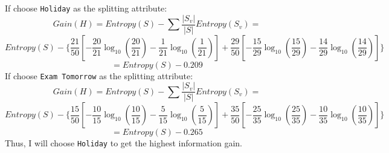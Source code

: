 If choose \texttt{Holiday} as the splitting attribute:
\begin{equation*}
	Gain(H) = Entropy(S) - \sum \frac{|S_v|}{|S|}Entropy(S_v)=
\end{equation*}
\begin{equation*}
	Entropy(S) - \{\frac{21}{50}[-\frac{20}{21}\log_{10}(\frac{20}{21})-\frac{1}{21}\log_{10}(\frac{1}{21})] + \frac{29}{50}[-\frac{15}{29}\log_{10}(\frac{15}{29})-\frac{14}{29}\log_{10}(\frac{14}{29})]\}
\end{equation*}
\begin{equation*}
	 = Entropy(S)-0.209
\end{equation*}
If choose \texttt{Exam Tomorrow} as the splitting attribute:
\begin{equation*}
	Gain(H) = Entropy(S) - \sum \frac{|S_v|}{|S|}Entropy(S_v)=
\end{equation*}
\begin{equation*}
	Entropy(S) - \{\frac{15}{50}[-\frac{10}{15}\log_{10}(\frac{10}{15})-\frac{5}{15}\log_{10}(\frac{5}{15})] + \frac{35}{50}[-\frac{25}{35}\log_{10}(\frac{25}{35})-\frac{10}{35}\log_{10}(\frac{10}{35})]\}
\end{equation*}
\begin{equation*}
	 = Entropy(S)-0.265
\end{equation*}
Thus, I will choose \texttt{Holiday} to get the highest information gain.

